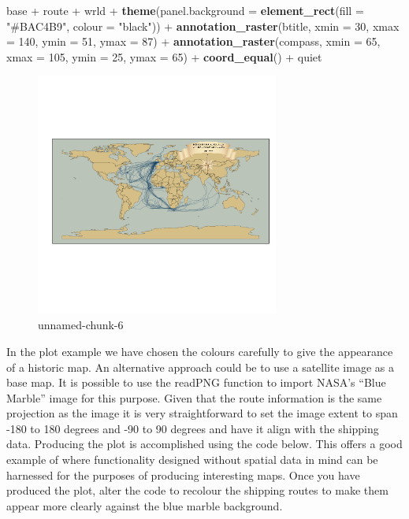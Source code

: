 \documentclass[]{article}
\newenvironment{Shaded}{}{}
\newcommand{\KeywordTok}[1]{\textcolor[rgb]{0.00,0.44,0.13}{\textbf{{#1}}}}
\newcommand{\DataTypeTok}[1]{\textcolor[rgb]{0.56,0.13,0.00}{{#1}}}
\newcommand{\DecValTok}[1]{\textcolor[rgb]{0.25,0.63,0.44}{{#1}}}
\newcommand{\StringTok}[1]{\textcolor[rgb]{0.25,0.44,0.63}{{#1}}}
\newcommand{\NormalTok}[1]{{#1}}
\let\Oldincludegraphics\includegraphics
\renewcommand{\includegraphics}[1]{\Oldincludegraphics[width=8cm]{#1}}
\begin{document}
\begin{Shaded}
\begin{Highlighting}[]
\NormalTok{base + route + wrld + }\KeywordTok{theme}\NormalTok{(}\DataTypeTok{panel.background =} \KeywordTok{element_rect}\NormalTok{(}\DataTypeTok{fill =} \StringTok{"#BAC4B9"}\NormalTok{, }
    \DataTypeTok{colour =} \StringTok{"black"}\NormalTok{)) + }\KeywordTok{annotation_raster}\NormalTok{(btitle, }\DataTypeTok{xmin =} \DecValTok{30}\NormalTok{, }\DataTypeTok{xmax =} \DecValTok{140}\NormalTok{, }\DataTypeTok{ymin =} \DecValTok{51}\NormalTok{, }
    \DataTypeTok{ymax =} \DecValTok{87}\NormalTok{) + }\KeywordTok{annotation_raster}\NormalTok{(compass, }\DataTypeTok{xmin =} \DecValTok{65}\NormalTok{, }\DataTypeTok{xmax =} \DecValTok{105}\NormalTok{, }\DataTypeTok{ymin =} \DecValTok{25}\NormalTok{, }
    \DataTypeTok{ymax =} \DecValTok{65}\NormalTok{) + }\KeywordTok{coord_equal}\NormalTok{() + quiet}
\end{Highlighting}
\end{Shaded}
\begin{figure}[htbp]
\centering
\includegraphics{figure/unnamed-chunk-6.png}
\caption{unnamed-chunk-6}
\end{figure}

In the plot example we have chosen the colours carefully to give the
appearance of a historic map. An alternative approach could be to use a
satellite image as a base map. It is possible to use the readPNG
function to import NASA's ``Blue Marble'' image for this purpose. Given
that the route information is the same projection as the image it is
very straightforward to set the image extent to span -180 to 180 degrees
and -90 to 90 degrees and have it align with the shipping data.
Producing the plot is accomplished using the code below. This offers a
good example of where functionality designed without spatial data in
mind can be harnessed for the purposes of producing interesting maps.
Once you have produced the plot, alter the code to recolour the shipping
routes to make them appear more clearly against the blue marble
background.
\end{document}
